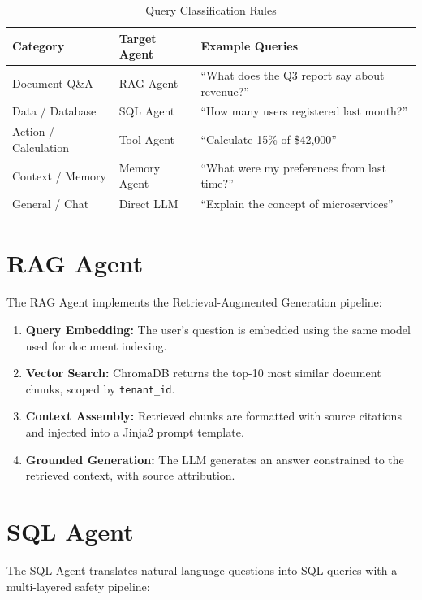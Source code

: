 \documentclass[12pt, a4paper]{report}
\begin{document}
\begin{table}[H]
\centering
\caption{Query Classification Rules}
\label{tab:routing}
\begin{tabularx}{\textwidth}{l|l|X}
\toprule
\textbf{Category} & \textbf{Target Agent} & \textbf{Example Queries} \\
\midrule
Document Q\&A       & RAG Agent    & ``What does the Q3 report say about revenue?'' \\
Data / Database     & SQL Agent    & ``How many users registered last month?'' \\
Action / Calculation& Tool Agent   & ``Calculate 15\% of \$42,000'' \\
Context / Memory    & Memory Agent & ``What were my preferences from last time?'' \\
General / Chat      & Direct LLM   & ``Explain the concept of microservices'' \\
\bottomrule
\end{tabularx}
\end{table}

\section{RAG Agent}

The RAG Agent implements the Retrieval-Augmented Generation pipeline:

\begin{enumerate}
    \item \textbf{Query Embedding:} The user's question is embedded using the same model used for document indexing.
    \item \textbf{Vector Search:} ChromaDB returns the top-10 most similar document chunks, scoped by \texttt{tenant\_id}.
    \item \textbf{Context Assembly:} Retrieved chunks are formatted with source citations and injected into a Jinja2 prompt template.
    \item \textbf{Grounded Generation:} The LLM generates an answer constrained to the retrieved context, with source attribution.
\end{enumerate}

\section{SQL Agent}

The SQL Agent translates natural language questions into SQL queries with a multi-layered safety pipeline:
\end{document}
